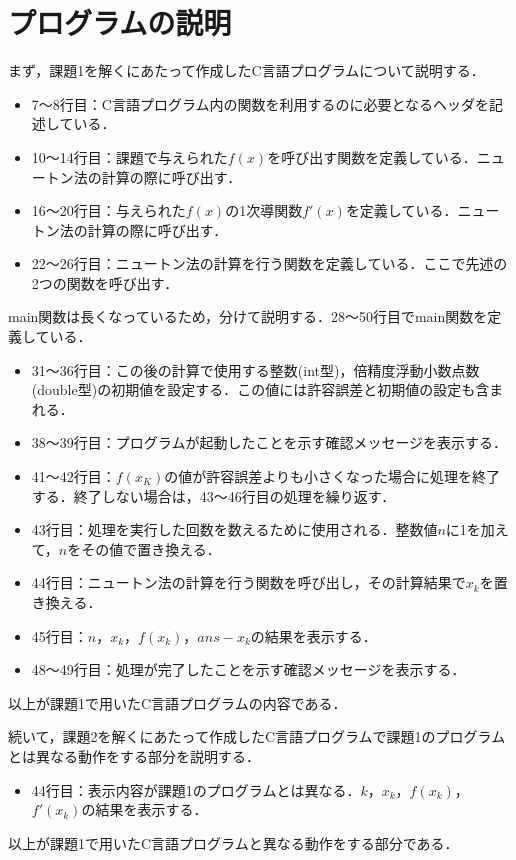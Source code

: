 \documentclass[12pt]{jarticle}
\renewcommand  \[  {\begin{eqnarray}}
\renewcommand  \]  {\end{eqnarray}}
\begin{document}
\section{プログラムの説明}
まず，課題1を解くにあたって作成したC言語プログラムについて説明する．
\begin{itemize}
\item{7〜8行目：C言語プログラム内の関数を利用するのに必要となるヘッダを記述している．}
\item{10〜14行目：課題で与えられた$f(x)$を呼び出す関数を定義している．ニュートン法の計算の際に呼び出す．}
\item{16〜20行目：与えられた$f(x)$の1次導関数$f\prime(x)$を定義している．ニュートン法の計算の際に呼び出す．}
\item{22〜26行目：ニュートン法の計算を行う関数を定義している．ここで先述の2つの関数を呼び出す．}
\end{itemize}
main関数は長くなっているため，分けて説明する．28〜50行目でmain関数を定義している．
\begin{itemize}
\item{31〜36行目：この後の計算で使用する整数(int型)，倍精度浮動小数点数(double型)の初期値を設定する．この値には許容誤差と初期値の設定も含まれる．}
\item{38〜39行目：プログラムが起動したことを示す確認メッセージを表示する．}
\item{41〜42行目：$f(x_K)$の値が許容誤差よりも小さくなった場合に処理を終了する．終了しない場合は，43〜46行目の処理を繰り返す．}
\item{43行目：処理を実行した回数を数えるために使用される．整数値$n$に1を加えて，$n$をその値で置き換える．}
\item{44行目：ニュートン法の計算を行う関数を呼び出し，その計算結果で$x_k$を置き換える．}
\item{45行目：$n$，$x_k$，$f(x_k)$，$ans-x_k$の結果を表示する．}
\item{48〜49行目：処理が完了したことを示す確認メッセージを表示する．}
\end{itemize}
以上が課題1で用いたC言語プログラムの内容である．


続いて，課題2を解くにあたって作成したC言語プログラムで課題1のプログラムとは異なる動作をする部分を説明する．
\begin{itemize}
\item{44行目：表示内容が課題1のプログラムとは異なる．$k$，$x_k$，$f(x_k)$，$f\prime(x_k)$の結果を表示する．}
\end{itemize}
以上が課題1で用いたC言語プログラムと異なる動作をする部分である．
\end{document}
